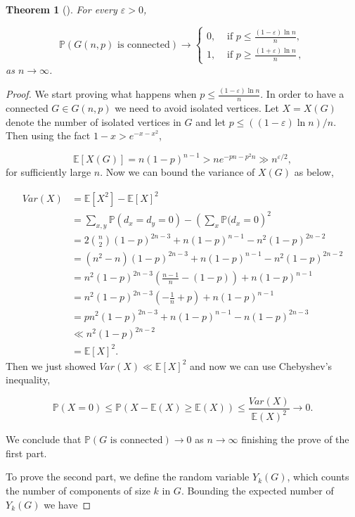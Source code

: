 \documentclass[12pt,twoside,a4paper,bibliography=totocnumbered]{book}
\numberwithin{equation}{section}
\let\log=\ln
\newtheorem{theorem}             {Theorem}[section]
\theoremstyle{remark}
\begin{document}
\begin{theorem}[\cite{ReEr60}]
For every $\varepsilon > 0$,

$$
\mathbb{P}(G(n,p)\text{ is connected}) \rightarrow 
\begin{cases}
		0, &\text{ if }p \leq \frac{(1 - \varepsilon) \log n}{n},\\
		1, &\text{ if }p \geq \frac{(1 + \varepsilon) \log n}{n}\,,
\end{cases}
$$
as $n \rightarrow \infty$.
\end{theorem}
\begin{proof}
We start proving what happens when $p \leq \frac{(1 - \varepsilon) \log n}{n}$. In order to have a connected $G \in G(n,p)$ we need to avoid isolated vertices. Let $X=X(G)$ denote the number of isolated vertices in $G$ and let $p\leq((1-\varepsilon) \log n) /n$. Then using the fact $1-x > e^{-x-x^2}$,

$$ \mathbb{E}[X(G)] = n(1-p)^{n-1} > ne^{-pn-p^2n} \gg n^{\varepsilon/2},$$
for sufficiently large $n$. Now we can bound the variance of $X(G)$ as below,

\begin{align*}
Var(X) &= \mathbb{E}[X^2 ] - \mathbb{E}[X]^2\\
&= \sum_{x,y} \mathbb{P}(d_x = d_y =0) - \left( \sum_x \mathbb{P}(d_x = 0\right)^2\\
& = 2\binom{n}{2} (1-p)^{2n-3} + n(1-p)^{n-1} - n^2(1-p)^{2n-2}\\
& = (n^2 - n)(1-p)^{2n-3} + n(1-p)^{n-1} - n^2(1-p)^{2n-2}\\
& = n^2(1-p)^{2n-3}\left( \frac{n-1}{n} - (1-p) \right) + n(1-p)^{n-1}\\
& = n^2(1-p)^{2n-3}\left( -\frac{1}{n} + p \right) + n(1-p)^{n-1}\\
& = pn^2 (1-p)^{2n-3} + n(1-p)^{n-1} - n(1-p)^{2n-3}\\
& \ll n^2 (1-p)^{2n-2}\\
& = \mathbb{E}[X]^2.
\end{align*}
Then we just showed $Var(X) \ll \mathbb{E}[X]^2$ and now we can use Chebyshev's  inequality,

$$\mathbb{P}(X=0) \leq \mathbb{P} (X-\mathbb{E}(X) \geq \mathbb{E}(X)) \leq \frac{Var(X)}{\mathbb{E}(X)^2} \rightarrow 0.$$

We conclude that $\mathbb{P}(G\text{ is connected}) \rightarrow 0$ as $n \rightarrow \infty$ finishing the prove of the first part.

To prove the second part, we define the random variable $Y_k(G)$, which counts the number of components of size $k$ in $G$. Bounding the expected number of $Y_k(G)$ we have


\end{proof}
\end{document}
